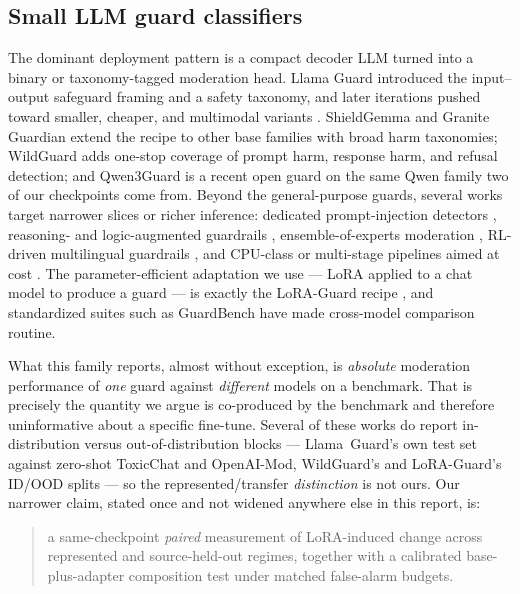 \subsection{Small LLM guard classifiers}
\label{sec:related-guards}
The dominant deployment pattern is a compact decoder LLM turned into a binary or taxonomy-tagged
moderation head. Llama Guard \citep{inan2023llamaguard} introduced the input--output
safeguard framing and a safety taxonomy, and later iterations pushed toward smaller, cheaper, and
multimodal variants \citep{meta2024llamaguard2,meta2024llamaguard3_8b,meta2024llamaguard3_1b,%
fedorov2024llamaguard3_1b,meta2025llamaguard4}. ShieldGemma \citep{zeng2024shieldgemma} and Granite
Guardian \citep{padhi2024graniteguardian} extend the recipe to other base families with broad harm
taxonomies; WildGuard \citep{han2024wildguard} adds one-stop coverage of prompt harm,
response harm, and refusal detection; and Qwen3Guard \citep{qwen3guard2025} is a recent open guard on
the same Qwen family two of our checkpoints come from. Beyond the general-purpose guards, several works
target narrower slices or richer inference: dedicated prompt-injection detectors
\citep{meta2024promptguard,meta2025promptguard2_86m,meta2025promptguard2_22m}, reasoning- and
logic-augmented guardrails \citep{kang2025r2guard}, ensemble-of-experts moderation
\citep{ghosh2024aegis}, RL-driven multilingual guardrails \citep{deng2025duoguard}, and CPU-class or
multi-stage pipelines aimed at cost \citep{majhi2025gpuguard}. The parameter-efficient adaptation we
use --- LoRA \citep{hu2021lora} applied to a chat model to produce a guard --- is exactly the LoRA-Guard
recipe \citep{elesedy2024loraguard}, and standardized suites such as GuardBench
\citep{bassani2024guardbench} have made cross-model comparison routine.

What this family reports, almost without exception, is \emph{absolute} moderation performance of
\emph{one} guard against \emph{different} models on a benchmark. That is precisely the quantity we argue
is co-produced by the benchmark and therefore uninformative about a specific fine-tune. Several of these
works do report in-distribution versus out-of-distribution blocks --- Llama~Guard's own test set against
zero-shot ToxicChat and OpenAI-Mod, WildGuard's and LoRA-Guard's ID/OOD splits --- so the
represented/transfer \emph{distinction} is not ours. Our narrower claim, stated once and not widened
anywhere else in this report, is:

\begin{quote}
a same-checkpoint \emph{paired} measurement of LoRA-induced change across represented and
source-held-out regimes, together with a calibrated base-plus-adapter composition test under matched
false-alarm budgets.
\end{quote}

